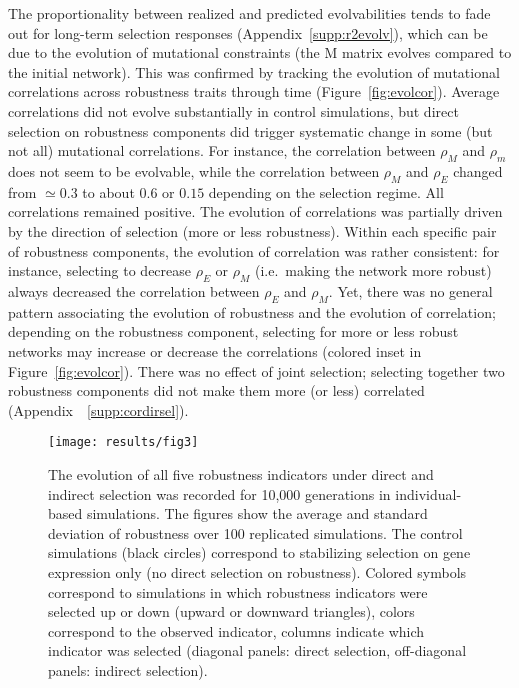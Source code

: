 \documentclass[10pt,a4paper]{article}
\newcommand{\earlyenv}{{\rho_E}}
\newcommand{\earlymut}{{\rho_M}}
\newcommand{\latemut}{{\rho_m}}
\newcommand{\M}{\bm{\mathrm M}}
\newcommand{\SupMat}{Appendix~}
\begin{document}
The proportionality between realized and predicted evolvabilities tends to fade out for long-term selection responses (\SupMat \ref{supp:r2evolv}), which can be due to the evolution of mutational constraints (the $\M$ matrix evolves compared to the initial network). This was confirmed by tracking the evolution of mutational correlations across robustness traits through time (Figure~\ref{fig:evolcor}). Average correlations did not evolve substantially in control simulations, but direct selection on robustness components did trigger systematic change in some (but not all) mutational correlations. For instance, the correlation between $\earlymut$ and $\latemut$ does not seem to be evolvable, while the correlation between $\earlymut$ and $\earlyenv$ changed from $\simeq 0.3$ to about $0.6$ or $0.15$ depending on the selection regime. All correlations remained positive. The evolution of correlations was partially driven by the direction of selection (more or less robustness). Within each specific pair of robustness components, the evolution of correlation was rather consistent: for instance, selecting to decrease $\earlyenv$ or $\earlymut$ (i.e.\ making the network more robust) always decreased the correlation between $\earlyenv$ and $\earlymut$. Yet, there was no general pattern associating the evolution of robustness and the evolution of correlation; depending on the robustness component, selecting for more or less robust networks may increase or decrease the correlations (colored inset in Figure~\ref{fig:evolcor}). There was no effect of joint selection; selecting together two robustness components did not make them more (or less) correlated (\SupMat~\ref{supp:cordirsel}).

\begin{figure}[tp!]
\begin{adjustwidth}{-1.5in}{0in}
\begin{flushright}
\texttt{[image: results/fig3]}
\caption{\color{Gray} \label{fig:evol} The evolution of all five robustness indicators under direct and indirect selection was recorded for 10,000 generations in individual-based simulations. The figures show the average and standard deviation of robustness over 100 replicated simulations. The control simulations (black circles) correspond to stabilizing selection on gene expression only (no direct selection on robustness). Colored symbols correspond to simulations in which robustness indicators were selected up or down (upward or downward triangles), colors correspond to the observed indicator, columns indicate which indicator was selected (diagonal panels: direct selection, off-diagonal panels: indirect selection).}
\end{flushright}\end{adjustwidth}
\end{figure}
\end{document}
